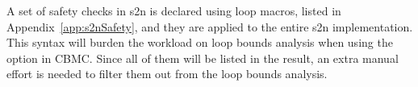 \begin{table}[h]

\centering
\begin{minipage}[t]{.4\textwidth}
\centering
{}


\end{minipage}\hfill
\begin{minipage}[t]{.5\textwidth}
\centering
{}

\end{minipage}
\hfill
{}
\end{table}

A set of safety checks in s2n is declared using  loop macros, listed in Appendix~\ref{app:s2nSafety}, and they are applied to the entire s2n implementation. This syntax will burden the workload on loop bounds analysis when using the  option in CBMC. Since all of them will be listed in the result, an extra manual effort is needed to filter them out from the loop bounds analysis.